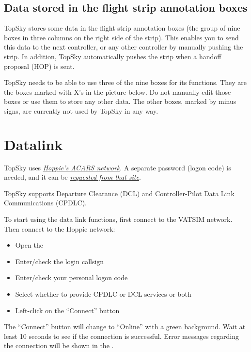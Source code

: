 \documentclass[a4paper,oneside,11pt]{memoir}
\begin{document}
\subsection{Data stored in the flight strip annotation boxes}

TopSky stores some data in the flight strip annotation boxes (the group of nine boxes in three columns on the right side of the strip). This enables you to send this data to the next controller, or any other controller by manually pushing the strip. In addition, TopSky automatically pushes the strip when a handoff proposal (HOP) is sent.

\bigskip

TopSky needs to be able to use three of the nine boxes for its functions. They are the boxes marked with X’s in the picture below. Do not manually edit those boxes or use them to store any other data. The other boxes, marked by minus signs, are currently not used by TopSky in any way.


\section{Datalink}

TopSky uses \textit{\href{http://www.hoppie.nl/acars}{Hoppie’s ACARS network}}. A separate password (logon code) is needed, and it can be \textit{\href{https://www.hoppie.nl/acars/system/register.html}{requested from that site}}. 

\bigskip

TopSky supports Departure Clearance (DCL) and Controller-Pilot Data Link Communications (CPDLC).

\bigskip

To start using the data link functions, first connect to the VATSIM network. Then connect to the Hoppie network:

\begin{itemize}
  \item Open the 
  \item Enter/check the login callsign
  \item Enter/check your personal logon code
  \item Select whether to provide CPDLC or DCL services or both
  \item Left-click on the “Connect” button
\end{itemize}

The “Connect” button will change to “Online” with a green background. Wait at least 10 seconds to see if the connection is successful. Error messages regarding the connection will be shown in the . 
\end{document}
